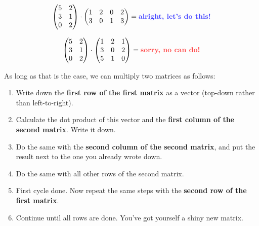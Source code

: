 \[
    \begin{pmatrix}
        5 & 2\\
        3 & 1\\
        0 & 2\\
    \end{pmatrix}
    \cdot
    \begin{pmatrix}
        1 & 2 & 0 & 2\\
        3 & 0 & 1 & 3\\
    \end{pmatrix}
    =
    \text{\textbf{\color{blue!75}alright, let's do this!}}
\]

\[
    \begin{pmatrix}
        5 & 2\\
        3 & 1\\
        0 & 2\\
    \end{pmatrix}
    \cdot
    \begin{pmatrix}
        1 & 2 & 1\\
        3 & 0 & 2\\
        5 & 1 & 0\\
    \end{pmatrix}
    =
    \text{\textbf{\color{red!75}sorry, no can do!}}
\]

As long as that is the case, we can multiply two matrices as follows:

\begin{enumerate}
    \item Write down the \textbf{first row of the first matrix} as a vector (top-down rather than left-to-right).
    \item Calculate the dot product of this vector and the \textbf{first column of the second matrix}.
          Write it down.
    \item Do the same with the \textbf{second column of the second matrix}, and put the result next to the one you already wrote down.
    \item Do the same with all other rows of the second matrix.
    \item First cycle done.
          Now repeat the same steps with the \textbf{second row of the first matrix}.
    \item Continue until all rows are done.
          You've got yourself a shiny new matrix.
\end{enumerate}

